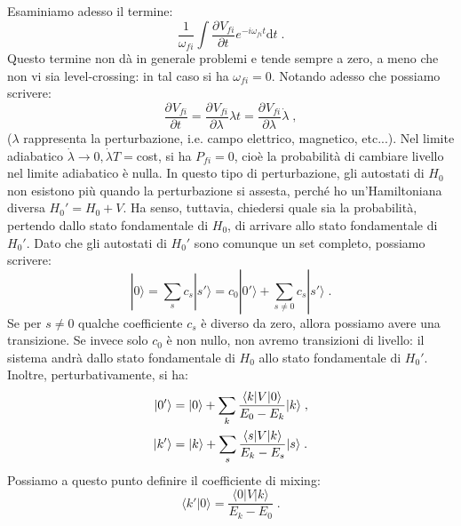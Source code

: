\documentclass[12pt,a4paper]{report}
\theoremstyle{definition}
\newcommand{\pdev}[3][]{\frac{\partial^{#1} #2}{\partial #3^{#1}}}
\numberwithin{equation}{section}
\newcommand{\diff}[1][]{\mathrm{d}#1}
\newcommand{\bra}{\langle}
\newcommand{\ket}{\rangle}
\begin{document}
Esaminiamo adesso il termine:
\begin{equation}
\frac{1}{\omega_{fi}}\int \pdev{V_{fi}}{t}e^{-i\omega_{fi}t}\diff{t}\;.
\end{equation}
Questo termine non dà in generale problemi e tende sempre a zero, a meno che non vi sia level-crossing: in tal caso si ha $\omega_{fi}=0$. Notando adesso che possiamo scrivere:
\begin{equation}
\pdev{V_{fi}}{t}=\pdev{V_{fi}}{\lambda}{\lambda}{t}=\pdev{V_{fi}}{\lambda}\dot{\lambda}\;,
\end{equation}
($\lambda$ rappresenta la perturbazione, i.e. campo elettrico, magnetico, etc...). Nel limite adiabatico $\dot{\lambda}\to 0,\dot{\lambda}T=$cost, si ha $P_{fi}=0$, cioè la probabilità di cambiare livello nel limite adiabatico è nulla. In questo tipo di perturbazione, gli autostati di $H_0$ non esistono più quando la perturbazione si assesta, perché ho un'Hamiltoniana diversa $H_0'=H_0+V$. Ha senso, tuttavia, chiedersi quale sia la probabilità, pertendo dallo stato fondamentale di $H_0$, di arrivare allo stato fondamentale di $H_0'$. Dato che gli autostati di $H_0'$ sono comunque un set completo, possiamo scrivere:
\begin{equation}
|0\ket=\sum_s c_s|s'\ket=c_0|0'\ket+\sum_{s\ne 0} c_s|s'\ket\;.
\end{equation}
Se per $s\ne 0$ qualche coefficiente $c_s$ è diverso da zero, allora possiamo avere una transizione. Se invece solo $c_0$ è non nullo, non avremo transizioni di livello: il sistema andrà dallo stato fondamentale di $H_0$ allo stato fondamentale di $H_0'$. Inoltre, perturbativamente, si ha:
\begin{align}
|0'\ket &=|0\ket+\sum_k \frac{\bra k|V|0\ket}{E_0-E_k}|k\ket\;, \notag \\
|k'\ket &=|k\ket+\sum_s \frac{\bra s|V|k\ket}{E_k-E_s}|s\ket\;.
\end{align}
Possiamo a questo punto definire il coefficiente di mixing:
\begin{equation}
\bra k'|0\ket=\frac{\bra 0|V|k\ket}{E_k-E_0}\;.
\end{equation}
\end{document}
